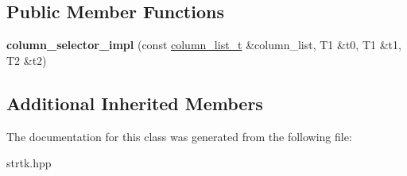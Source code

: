 \subsection*{Public Member Functions}
\begin{DoxyCompactItemize}
\item 
\hypertarget{classstrtk_1_1details_1_1column__selector__impl_3_01T0_00_01T1_00_01T2_01_4_a8aff7bfbec6ebab2d8a37c80b1ef9f2f}{{\bfseries column\-\_\-selector\-\_\-impl} (const \hyperlink{structstrtk_1_1details_1_1column__list__impl}{column\-\_\-list\-\_\-t} \&column\-\_\-list, T1 \&t0, T1 \&t1, T2 \&t2)}\label{classstrtk_1_1details_1_1column__selector__impl_3_01T0_00_01T1_00_01T2_01_4_a8aff7bfbec6ebab2d8a37c80b1ef9f2f}

\end{DoxyCompactItemize}
\subsection*{Additional Inherited Members}


The documentation for this class was generated from the following file\-:\begin{DoxyCompactItemize}
\item 
strtk.\-hpp\end{DoxyCompactItemize}
